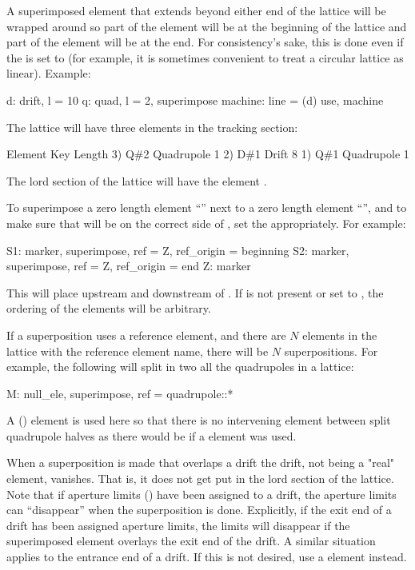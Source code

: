 A superimposed element that extends beyond either end of the lattice
will be wrapped around so part of the element will be at the beginning
of the lattice and part of the element will be at the end. For
consistency's sake, this is done even if the  is set to
 (for example, it is sometimes convenient to treat a circular
lattice as linear). Example:
\begin{example}
  d: drift, l = 10
  q: quad, l = 2, superimpose
  machine: line = (d)
  use, machine
\end{example}
The lattice will have three elements in the tracking section:
\begin{example}
        Element   Key           Length
  3)    Q{\#}2       Quadrupole    1
  2)    D{\#}1       Drift         8
  1)    Q{\#}1       Quadrupole    1
\end{example}
The lord section of the lattice will have the element . 

To superimpose a zero length element ``'' next to a zero length
element ``'', and to make sure that  will be on the
correct side of , set the  appropriately.
For example:
\begin{example}
  S1: marker, superimpose, ref = Z, ref_origin = beginning
  S2: marker, superimpose, ref = Z, ref_origin = end
  Z: marker
\end{example}
This will place  upstream and  downstream of .  If
 is not present or set to , the ordering of the
elements will be arbitrary.

If a superposition uses a reference element, and there are $N$ elements in the lattice with the
reference element name, there will be $N$ superpositions. For example, the following will
split in two all the quadrupoles in a lattice:
\begin{example}
  M: null_ele, superimpose, ref = quadrupole::*
\end{example}
A  () element is used here so that there is no intervening element
between split quadrupole halves as there would be if a  element was used.


When a superposition is made that overlaps a drift the drift, not being a "real" element,
vanishes. That is, it does not get put in the lord section of the lattice.  Note that if aperture
limits () have been assigned to a drift, the aperture limits can ``disappear'' when
the superposition is done. Explicitly, if the exit end of a drift has been assigned aperture limits,
the limits will disappear if the superimposed element overlays the exit end of the drift. A similar
situation applies to the entrance end of a drift. If this is not desired, use a  element
instead.

